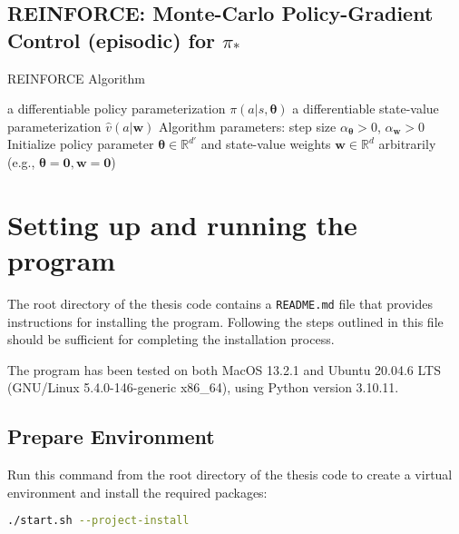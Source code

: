 \documentclass[../xlapes02]{subfiles}
\begin{document}
    \section{REINFORCE: Monte-Carlo Policy-Gradient Control (episodic) for $\pi_*$}
    \begin{algorithm}[h!]
        \caption{REINFORCE Algorithm}
        \label{alg:REINFORCE}

        a differentiable policy parameterization $\pi(a|s, \bm{\theta})$\;
        a differentiable state-value parameterization $\hat{v}(a|\bm{w})$\;
        Algorithm parameters: step size $\alpha_{\bm{\theta}} > 0$, $\alpha_{\bm{w}} > 0$\;
        Initialize policy parameter $\bm{\theta} \in \mathbb{R}^{d'}$ and state-value weights $\bm{w} \in \mathbb{R}^{d}$ arbitrarily (e.g., $\bm{\theta} = \bm{0}, \bm{w} = \bm{0}$)\;

    \end{algorithm}


    \chapter{Setting up and running the program}
    The root directory of the thesis code contains a \texttt{README.md} file that provides instructions for installing the program. Following the steps outlined in this file should be sufficient for completing the installation process.

    The program has been tested on both MacOS 13.2.1 and Ubuntu 20.04.6 LTS (GNU/Linux 5.4.0-146-generic x86\_64), using Python version 3.10.11.


    \section{Prepare Environment}
    Run this command from the root directory of the thesis code to create a virtual environment and install the required packages:
    \begin{lstlisting}[language=bash]
./start.sh --project-install
    \end{lstlisting}
\end{document}

